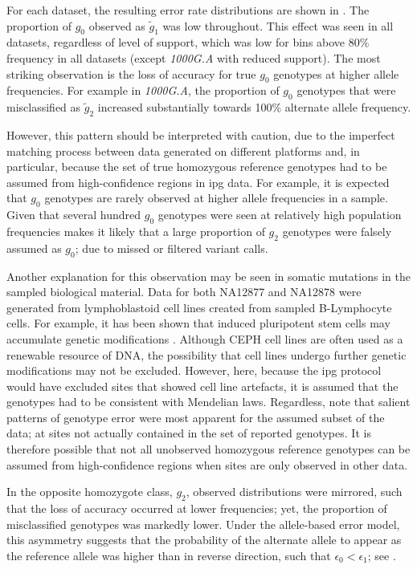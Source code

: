 For each dataset, the resulting error rate distributions are shown in .
The proportion of $g_0$ observed as $\tilde{g}_1$ was low throughout.
This effect was seen in all  datasets, regardless of level of support, which was low for bins above 80\% frequency in all datasets (except \emph{1000G.A} with reduced support).
The most striking observation is the loss of accuracy for true $g_0$ genotypes at higher allele frequencies.
For example in \emph{1000G.A}, the proportion of $g_0$ genotypes that were misclassified as $\tilde{g}_2$ increased substantially towards 100\% alternate allele frequency.

However, this pattern should be interpreted with caution, due to the imperfect matching process between data generated on different platforms and, in particular, because the set of true homozygous reference genotypes had to be assumed from high-confidence regions in \gls{ipg} data.
For example, it is expected that $g_0$ genotypes are rarely observed at higher allele frequencies in a sample.
Given that several hundred $g_0$ genotypes were seen at relatively high population frequencies makes it likely that a large proportion of $g_2$ genotypes were falsely assumed as $g_0$;
\eg due to missed or filtered variant calls.

Another explanation for this observation may be seen in somatic mutations in the sampled biological material.
Data for both \textsf{NA12877} and \textsf{NA12878} were generated from lymphoblastoid cell lines created from sampled B-Lymphocyte cells.
For example, it has been shown that induced pluripotent stem cells may accumulate genetic modifications \citep{Gore:2011id}.
Although CEPH cell lines are often used as a renewable resource of DNA, the possibility that cell lines undergo further genetic modifications may not be excluded.
However, here, because the \gls{ipg} protocol would have excluded sites that showed cell line artefacts, it is assumed that the genotypes had to be consistent with Mendelian laws.
Regardless, note that salient patterns of genotype error were most apparent for the assumed subset of the data; \ie at sites not actually contained in the set of reported genotypes.
It is therefore possible that not all unobserved homozygous reference genotypes can be assumed from high-confidence regions when sites are only observed in other data.


In the opposite homozygote class, $g_2$, observed distributions were mirrored, such that the loss of accuracy occurred at lower frequencies; yet, the proportion of misclassified genotypes was markedly lower.
Under the allele-based error model, this asymmetry suggests that the probability of the alternate allele to appear as the reference allele was higher than in reverse direction, such that ${\epsilon_0 < \epsilon_1}$; see .


